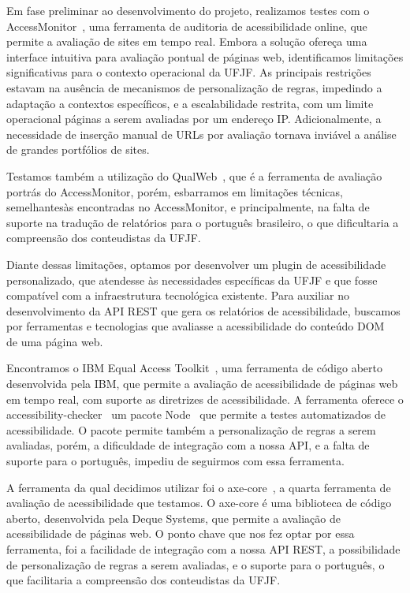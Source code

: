 \documentclass[
	article,			%
	12pt,				%
	oneside,			%
	a4paper,			%
	section=TITLE,		%
	subsection=TITLE,	%
	english,			%
	brazil,				%
	sumario=tradicional
	]{abntex2}
\begin{document}
Em fase preliminar ao desenvolvimento do projeto, realizamos testes com o
AccessMonitor~\cite{AM},
uma ferramenta de auditoria de acessibilidade online, que permite a avaliação de
sites em tempo real. Embora a solução ofereça uma interface intuitiva para
avaliação pontual de páginas web, identificamos limitações significativas para o
contexto operacional da UFJF. As principais restrições estavam na ausência de
mecanismos de personalização de regras, impedindo a adaptação a contextos
específicos, e a escalabilidade restrita, com um limite operacional páginas a
serem avaliadas por um endereço IP\@. Adicionalmente, a necessidade de inserção
manual de URLs por avaliação tornava inviável a análise de grandes portfólios de
sites\@.

Testamos também a utilização do QualWeb~\cite{qualweb}, que é a ferramenta
de avaliação portrás do AccessMonitor, porém, esbarramos em limitações técnicas,
semelhantesàs encontradas no AccessMonitor, e principalmente, na falta de suporte
na tradução de relatórios para o português brasileiro, o que dificultaria a compreensão dos
conteudistas da UFJF\@.

Diante dessas limitações, optamos por desenvolver um plugin de acessibilidade
personalizado, que atendesse às necessidades específicas da UFJF e que fosse
compatível com a infraestrutura tecnológica existente. Para auxiliar no
desenvolvimento da API REST que gera os relatórios de acessibilidade,
buscamos por ferramentas e tecnologias que avaliasse a acessibilidade
do conteúdo DOM~\cite{DOM} de uma página web.

Encontramos o IBM Equal Access Toolkit~\cite{IBMa}, uma ferramenta de código
aberto desenvolvida pela IBM, que permite a avaliação de acessibilidade de páginas
web em tempo real, com suporte as diretrizes de acessibilidade. A ferramenta oferece
o accessibility-checker~\cite{AC} um pacote Node~\cite{Node} que permite a
testes automatizados de acessibilidade. O pacote permite também a personalização de
regras a serem avaliadas,
porém, a dificuldade de integração com a nossa API, e a falta de suporte para o
português, impediu de seguirmos com essa ferramenta.

A ferramenta da qual decidimos utilizar foi o axe-core~\cite{axecore}, a quarta
ferramenta de avaliação de acessibilidade que testamos. O axe-core é uma biblioteca
de código aberto, desenvolvida pela Deque Systems, que permite a avaliação de acessibilidade
de páginas web. O ponto chave que nos fez optar por essa ferramenta, foi a facilidade
de integração com a nossa API REST, a possibilidade de personalização de regras a serem
avaliadas, e o suporte para o português, o que facilitaria a compreensão dos conteudistas
da UFJF\@.
\end{document}
